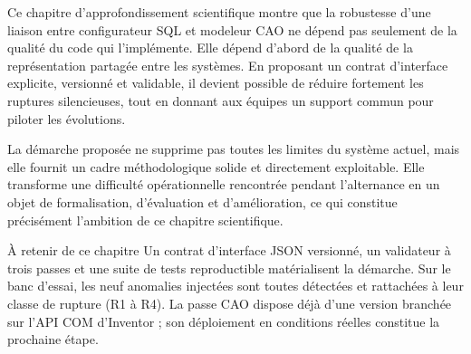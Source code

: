 Ce chapitre d'approfondissement scientifique montre que la robustesse d'une liaison entre configurateur SQL et modeleur CAO ne dépend pas seulement de la qualité du code qui l'implémente. Elle dépend d'abord de la qualité de la représentation partagée entre les systèmes. En proposant un contrat d'interface explicite, versionné et validable, il devient possible de réduire fortement les ruptures silencieuses, tout en donnant aux équipes un support commun pour piloter les évolutions.

La démarche proposée ne supprime pas toutes les limites du système actuel, mais elle fournit un cadre méthodologique solide et directement exploitable. Elle transforme une difficulté opérationnelle rencontrée pendant l'alternance en un objet de formalisation, d'évaluation et d'amélioration, ce qui constitue précisément l'ambition de ce chapitre scientifique.

\begin{encadretitre}{À retenir de ce chapitre}
Un contrat d'interface JSON versionné, un validateur à trois passes et une suite de tests reproductible matérialisent la démarche. Sur le banc d'essai, les neuf anomalies injectées sont toutes détectées et rattachées à leur classe de rupture (R1 à R4). La passe CAO dispose déjà d'une version branchée sur l'API COM d'Inventor ; son déploiement en conditions réelles constitue la prochaine étape.
\end{encadretitre}
